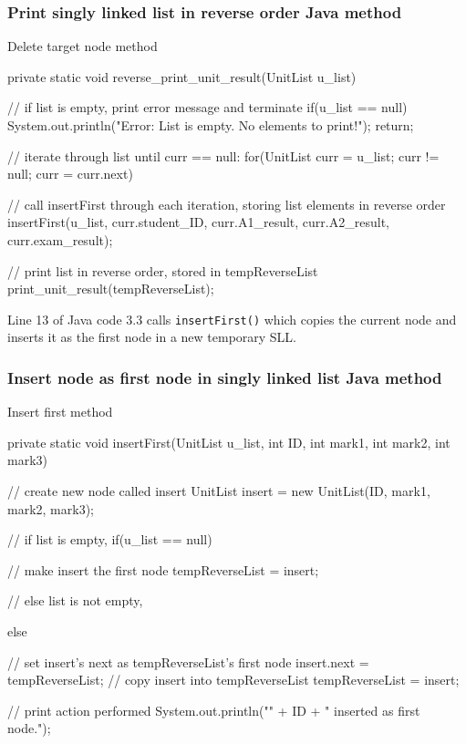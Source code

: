 \subsubsection{Print singly linked list in reverse order Java method}

\begin{listing}[H]
\caption{Delete target node method}
\begin{javacode}
private static void reverse_print_unit_result(UnitList u_list) {

    // if list is empty, print error message and terminate
    if(u_list == null) {
        System.out.println("Error: List is empty. No elements to print!");
        return;
    }

    // iterate through list until curr == null:
    for(UnitList curr = u_list; curr != null; curr = curr.next) {

        // call insertFirst through each iteration, storing list elements in reverse order
        insertFirst(u_list, curr.student_ID, curr.A1_result, curr.A2_result, curr.exam_result);
    }

    // print list in reverse order, stored in tempReverseList
    print_unit_result(tempReverseList);
}
\end{javacode}
\end{listing}

\noindent
Line 13 of Java code 3.3 calls \texttt{insertFirst()} which copies the current node and inserts it as the first node in a new temporary SLL.

\subsubsection{Insert node as first node in singly linked list Java method}

\begin{listing}[H]
\caption{Insert first method}
\begin{javacode}
private static void insertFirst(UnitList u_list, int ID, int mark1, int mark2, int mark3) {

    // create new node called insert
    UnitList insert = new UnitList(ID, mark1, mark2, mark3);

    // if list is empty,
    if(u_list == null) {

        // make insert the first node
        tempReverseList = insert;

    // else list is not empty,
    } else {

        // set insert's next as tempReverseList's first node
        insert.next = tempReverseList;
        // copy insert into tempReverseList
        tempReverseList = insert;
    }

    // print action performed
    System.out.println("\nStudent " + ID + " inserted as first node.");
}
\end{javacode}
\end{listing}

